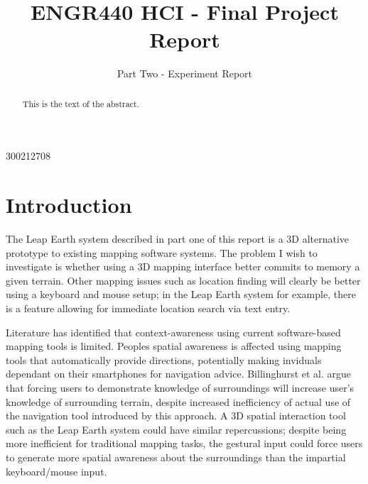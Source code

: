 \documentclass{sigplanconf}
\begin{document}
\setlength{\pdfpageheight}{\paperheight}
\setlength{\pdfpagewidth}{\paperwidth}






\title{ENGR440 HCI - Final Project Report}
\subtitle{Part Two - Experiment Report}

           {300212708}

\maketitle

\begin{abstract}
This is the text of the abstract.
\end{abstract}


\section{Introduction}

The Leap Earth system described in part one of this report is a 3D alternative prototype to existing mapping software systems. The problem I wish to investigate is whether using a 3D mapping interface better commits to memory a given terrain. Other mapping issues such as location finding will clearly be better using a keyboard and mouse setup; in the Leap Earth system for example, there is a feature allowing for immediate location search via text entry.

Literature has identified that context-awareness using current software-based mapping tools is limited. Peoples spatial awareness is affected using mapping tools that automatically provide directions, potentially making inviduals dependant on their smartphones for navigation advice. Billinghurst et al. \cite{wen2014really} argue that forcing users to demonstrate knowledge of surroundings will increase user's knowledge of surrounding terrain, despite increased inefficiency of actual use of the navigation tool introduced by this approach. A 3D spatial interaction tool such as the Leap Earth system could have similar repercussions; despite being more inefficient for traditional mapping tasks, the gestural input could force users to generate more spatial awareness about the surroundings than the impartial keyboard/mouse input.
\end{document}
